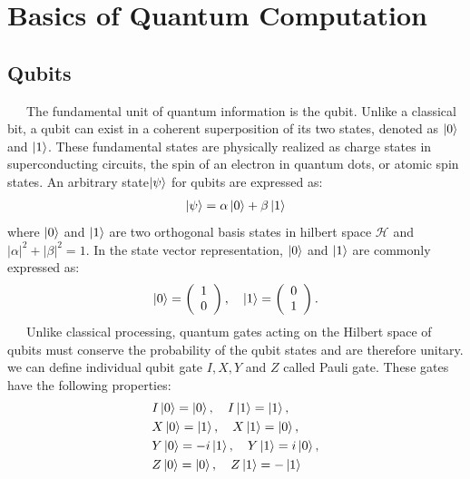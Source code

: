 \documentclass[a4paper,11pt]{ltjsarticle}
\begin{document}
\section{Basics of Quantum Computation}{
    \subsection{Qubits \cite{devitt2013}}\label{qubits}{
        \ \ \ The fundamental unit of quantum information is the qubit. Unlike a classical bit, a qubit can exist in a coherent superposition of its two states, denoted as $\ket{0}$ and $\ket{1}$. These fundamental states are physically realized as charge states in superconducting circuits, the spin of an electron in quantum dots, or atomic spin states. An arbitrary state$\ket{\psi}$ for qubits are expressed as:
        \begin{align}
            \ket{\psi}=\alpha\ket{0}+\beta\ket{1}
        \end{align}
        where $\ket{0}$ and $\ket{1}$ are two orthogonal basis states in hilbert space $\mathcal{H}$ and $|\alpha|^2+|\beta|^2=1$. In the state vector representation, $\ket{0}$ and $\ket{1}$ are commonly expressed as:
        \begin{align}
            \ket{0} =\left(\begin{array}{c}
                1\\
                0
            \end{array}\right),\ \ \ 
            \ket{1} =\left(\begin{array}{c}
                0\\
                1
            \end{array}\right).
        \end{align}
        \ \ \ Unlike classical processing, quantum gates acting on the Hilbert space of qubits must conserve the probability of the qubit states and are therefore unitary. we can define individual qubit gate $I, X, Y$ and $Z$ called Pauli gate. These gates have the following properties:
        \begin{align}
            &I\ket{0}=\ket{0},\ \ \ I\ket{1}=\ket{1},\nonumber\\
            &X\ket{0}=\ket{1},\ \ \ X\ket{1}=\ket{0},\\
            &Y\ket{0}=-i\ket{1},\ \ \ Y\ket{1}=i\ket{0},\nonumber\\
            &Z\ket{0}=\ket{0},\ \ \ Z\ket{1}=-\ket{1}\nonumber
        \end{align}
}}
\end{document}
